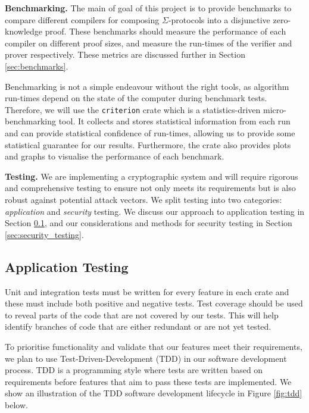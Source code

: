\textbf{Benchmarking.} The main of goal of this project is to provide benchmarks to compare different compilers for composing $\Sigma$-protocols into a disjunctive zero-knowledge proof. These benchmarks should measure the performance of each compiler on different proof sizes, and measure the run-times of the verifier and prover respectively. These metrics are discussed further in Section \ref{sec:benchmarks}. 

Benchmarking is not a simple endeavour without the right tools, as algorithm run-times depend on the state of the computer during benchmark tests. Therefore, we will use the \texttt{criterion} crate \cite{criterion} which is a statistics-driven micro-benchmarking tool. It collects and stores statistical information from each run and can provide statistical confidence of run-times, allowing us to provide some statistical guarantee for our results. Furthermore, the crate also provides plots and graphs to visualise the performance of each benchmark.

\textbf{Testing.} We are implementing a cryptographic system and will require rigorous and comprehensive testing to ensure not only meets its requirements but is also robust against potential attack vectors. We split testing into two categories: \textit{application} and \textit{security} testing. We discuss our approach to application testing in Section \ref{sec:application_testing}, and our considerations and methods for security testing in Section \ref{sec:security_testing}.

\subsection{Application Testing}
\label{sec:application_testing}
Unit and integration tests must be written for every feature in each crate and these must include both positive and negative tests. Test coverage should be used to reveal parts of the code that are not covered by our tests. This will help identify branches of code that are either redundant or are not yet tested.

To prioritise functionality and validate that our features meet their requirements, we plan to use Test-Driven-Development (TDD) in our software development process. TDD is a programming style where tests are written based on requirements before features that aim to pass these tests are implemented. We show an illustration of the TDD software development lifecycle in Figure \ref{fig:tdd} below.


